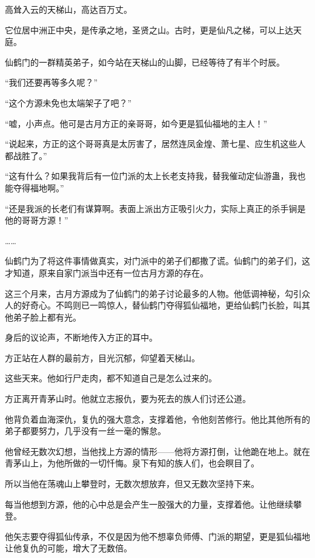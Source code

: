 
\begin{this_body}

高耸入云的天梯山，高达百万丈。

它位居中洲正中央，是传承之地，圣贤之山。古时，更是仙凡之梯，可以上达天庭。

仙鹤门的一群精英弟子，如今站在天梯山的山脚，已经等待了有半个时辰。

“我们还要再等多久呢？”

“这个方源未免也太端架子了吧？”

“嘘，小声点。他可是古月方正的亲哥哥，如今更是狐仙福地的主人！”

“说起来，方正的这个哥哥真是太厉害了，居然连凤金煌、萧七星、应生机这些人都战胜了。”

“这有什么？如果我背后有一位门派的太上长老支持我，替我催动定仙游蛊，我也能夺得福地啊。”

“还是我派的长老们有谋算啊。表面上派出方正吸引火力，实际上真正的杀手锏是他的哥哥方源！”

……

仙鹤门为了将这件事情做真实，对门派中的弟子们都撒了谎。仙鹤门的弟子们，这才知道，原来自家门派当中还有一位古月方源的存在。

这三个月来，古月方源成为了仙鹤门的弟子讨论最多的人物。他低调神秘，勾引众人的好奇心。不鸣则已一鸣惊人，替仙鹤门夺得狐仙福地，更给仙鹤门长脸，叫其他弟子脸上都有光。

身后的议论声，不断地传入方正的耳中。

方正站在人群的最前方，目光沉郁，仰望着天梯山。

这些天来。他如行尸走肉，都不知道自己是怎么过来的。

方正离开青茅山时。他就立志报仇，要为死去的族人们讨还公道。

他背负着血海深仇，复仇的强大意念，支撑着他，令他刻苦修行。他比其他所有的弟子都要努力，几乎没有一丝一毫的懈怠。

他曾经无数次幻想，当他找上方源的情形——他将方源打倒，让他跪在地上。就在青茅山上，为他所做的一切忏悔。泉下有知的族人们，也会瞑目了。

所以当他在荡魂山上攀登时，无数次想放弃，但又无数次坚持下来。

每当他想到方源，他的心中总是会产生一股强大的力量，支撑着他。让他继续攀登。

他矢志要夺得狐仙传承，不仅是因为他不想辜负师傅、门派的期望，更是狐仙福地让他复仇的可能，增大了无数倍。


\end{this_body}
